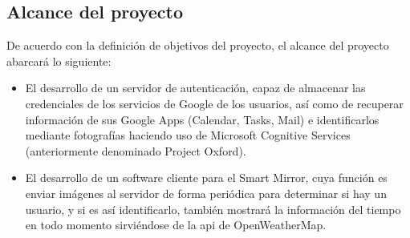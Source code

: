 \subsection{Alcance del proyecto}

De acuerdo con la definición de objetivos del proyecto, el alcance del proyecto abarcará lo siguiente:

\begin{itemize}
	\item El desarrollo de un servidor de autenticación, capaz de almacenar las credenciales de los servicios de Google de los usuarios, así como de recuperar información de sus Google Apps (Calendar, Tasks, Mail) e identificarlos mediante fotografías haciendo uso de Microsoft Cognitive Services (anteriormente denominado Project Oxford).
	
	\item El desarrollo de un software cliente para el Smart Mirror, cuya función es enviar imágenes al servidor de forma periódica para determinar si hay un usuario, y si es así identificarlo, también mostrará la información del tiempo en todo momento sirviéndose de la \acrshort{api} de OpenWeatherMap.

\end{itemize}